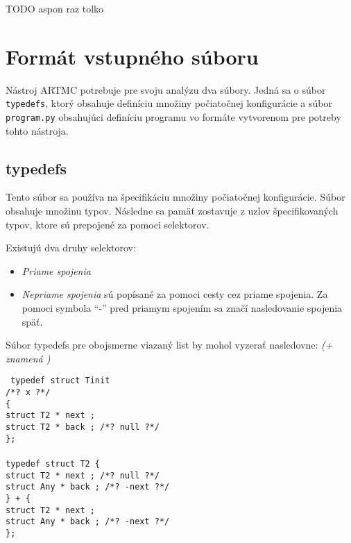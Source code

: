 TODO aspon raz tolko

\section{Formát vstupného súboru}
Nástroj ARTMC potrebuje pre svoju analýzu dva súbory. Jedná sa o súbor \texttt{typedefs}, ktorý obsahuje definíciu množiny počiatočnej konfigurácie a súbor \texttt{program.py} obsahujúci definíciu programu vo formáte vytvorenom pre potreby tohto nástroja.

\subsection{typedefs}
Tento súbor sa používa na špecifikáciu množiny počiatočnej konfigurácie. Súbor obsahuje množinu typov. Následne sa pamäť zostavuje z uzlov špecifikovaných typov, ktore sú prepojené za pomoci selektorov.

Existujú dva druhy selektorov:
\begin{itemize}
\item \textit{Priame spojenia}
\item \textit{Nepriame spojenia} sú popísané za pomoci cesty cez priame spojenia. Za pomoci symbola ``-'' pred priamym spojením sa značí nasledovanie spojenia späť.
\end{itemize}

Súbor typedefs pre obojsmerne viazaný list by mohol vyzerať nasledovne: \textit{(+ znamená )}

\texttt{
typedef struct Tinit\\                                                            
/*? x ?*/\\                                                                       
\{\\
  struct T2 * next ;\\                                                           
  struct T2 * back ; /*? null ?*/\\                                               
\};\\
                                                                                \\
typedef struct T2                                                           
\{\\
  struct T2 * next ; /*? null ?*/\\                                               
  struct Any * back ; /*? -next ?*/\\
\}
+
\{\\
  struct T2 * next ;\\                                                           
  struct Any * back ; /*? -next ?*/\\                                             
\};
}


